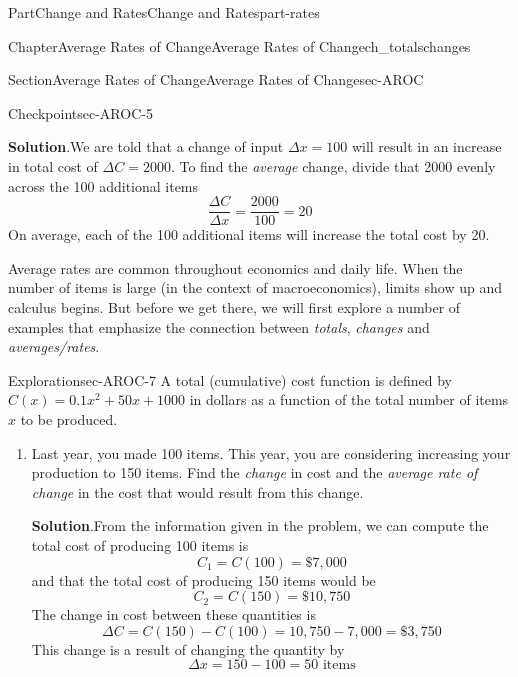 \documentclass[oneside,10pt,]{tufte-book}
\newcommand{\blocktitlefont}{\relax}
\numberwithin{equation}{chapter}
\begin{document}
\begin{partptx}{Part}{Change and Rates}{}{Change and Rates}{}{}{part-rates}
\begin{chapterptx}{Chapter}{Average Rates of Change}{}{Average Rates of Change}{}{}{ch_totalschanges}
\begin{sectionptx}{Section}{Average Rates of Change}{}{Average Rates of Change}{}{}{sec-AROC}
\begin{inlineexercise}{Checkpoint}{}{sec-AROC-5}
\par\smallskip%
\noindent\textbf{\blocktitlefont Solution}.\hypertarget{sec-AROC-5-2}{}\quad{}We are told that a change of input \(\Delta x = 100\) will result in an increase in total cost of \(\Delta C = 2000\). To find the \emph{average} change, divide that \textdollar{}2000 evenly across the 100 additional items%
\begin{equation*}
\dfrac{\Delta C}{\Delta x} = \dfrac{2000}{100} = 20
\end{equation*}
On average, each of the 100 additional items will increase the total cost by \textdollar{}20.%
\end{inlineexercise}%
Average rates are common throughout economics and daily life. When the number of items is large (in the context of macroeconomics), limits show up and calculus begins. But before we get there, we will first explore a number of examples that emphasize the connection between \emph{totals}, \emph{changes} and \emph{averages\slash{}rates}.%
\begin{exploration}{Exploration}{}{sec-AROC-7}%
A total (cumulative) cost function is defined by \(C(x) = 0.1 x^2 + 50 x + 1000 \) in dollars as a function of the total number of items \(x\) to be produced.%
\begin{enumerate}[font=\bfseries,label=(\alph*),ref=\alph*]%
\item{}Last year, you made 100 items. This year, you are considering increasing your production to 150 items. Find the \emph{change} in cost and the \emph{average rate of change} in the cost that would result from this change.%
\par\smallskip%
\noindent\textbf{\blocktitlefont Solution}.\hypertarget{sec-AROC-7-2-2}{}\quad{}From the information given in the problem, we can compute the total cost of producing 100 items is%
\begin{equation*}
C_1 = C(100) = \$ 7, 000
\end{equation*}
and that the total cost of producing 150 items would be%
\begin{equation*}
C_2 = C(150) = \$ 10, 750
\end{equation*}
The change in cost between these quantities is%
\begin{equation*}
\Delta C = C(150) - C(100) = 10,750 - 7,000 = \$ 3,750
\end{equation*}
This change is a result of changing the quantity by%
\begin{equation*}
\Delta x = 150 - 100 = 50 \text{ items}
\end{equation*}

\end{enumerate}
\end{exploration}
\end{sectionptx}
\end{chapterptx}
\end{partptx}
\end{document}
